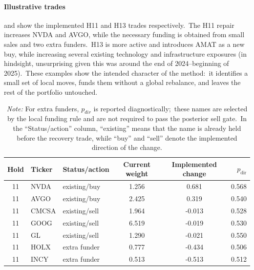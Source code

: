 \documentclass[11pt]{article}
\begin{document}
\FloatBarrier

\paragraph{Illustrative trades}

 and  show the implemented H11 and H13 trades respectively.\ The H11 repair increases NVDA and AVGO, while the necessary funding is obtained from small sales and two extra funders.\ H13 is more active and introduces AMAT as a new buy, while increasing several existing technology and infrastructure exposures (in hindsight, unsurprising given this was around the end of 2024--beginning of 2025).\ These examples show the intended character of the method:\ it identifies a small set of local moves, funds them without a global rebalance, and leaves the rest of the portfolio untouched.

\begin{table}[htbp]
\centering
\caption{Illustrative implemented trades in H11.\ Weights and changes are in percent.}
\label{tab:example-trades11}
\begin{tabular}{cllccr}
\toprule
Hold & Ticker & Status/action & Current weight & Implemented change & $p_{\mathrm{dir}}$ \\
\midrule
11 & NVDA & existing/buy & 1.256 & 0.681 & 0.568 \\
11 & AVGO & existing/buy & 2.425 & 0.319 & 0.540 \\
11 & CMCSA & existing/sell & 1.964 & -0.013 & 0.528 \\
11 & GOOG & existing/sell & 6.519 & -0.019 & 0.530 \\
11 & GL & existing/sell & 1.290 & -0.021 & 0.550 \\
11 & HOLX & extra funder & 0.777 & -0.434 & 0.506 \\
11 & INCY & extra funder & 0.513 & -0.513 & 0.512 \\
\bottomrule
\end{tabular}
\caption*{{\it Note:} For extra funders, $p_{dir}$ is reported diagnostically;\ these names are selected by the local funding rule and are not required to pass the posterior sell gate.\ In the ``Status/action'' column, ``existing'' means that the name is already held before the recovery trade, while ``buy'' and ``sell'' denote the implemented direction of the change.}
\end{table}
\end{document}
